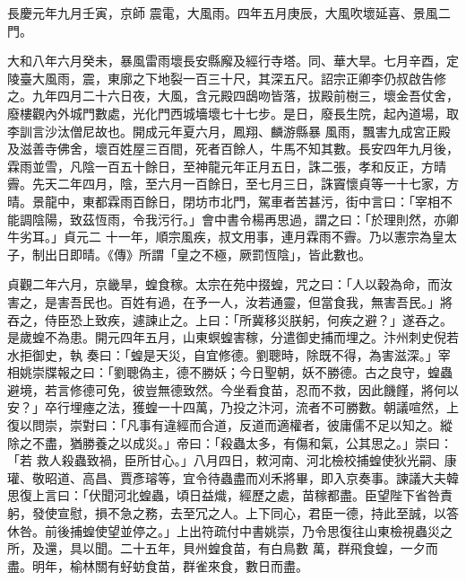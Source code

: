 \begin{pinyinscope}
 長慶元年九月壬寅，京師
 震電，大風雨。四年五月庚辰，大風吹壞延喜、景風二門。



 大和八年六月癸未，暴風雷雨壞長安縣廨及經行寺塔。同、華大旱。七月辛酉，定陵臺大風雨，震，東廓之下地裂一百三十尺，其深五尺。詔宗正卿李仍叔啟告修之。九年四月二十六日夜，大風，含元殿四鴟吻皆落，拔殿前樹三，壞金吾仗舍，廢樓觀內外城門數處，光化門西城墻壞七十七步。是日，廢長生院，起內道場，取李訓言沙汰僧尼故也。開成元年夏六月，鳳翔、麟游縣暴
 風雨，飄害九成宮正殿及滋善寺佛舍，壞百姓屋三百間，死者百餘人，牛馬不知其數。長安四年九月後，霖雨並雪，凡陰一百五十餘日，至神龍元年正月五日，誅二張，孝和反正，方晴霽。先天二年四月，陰，至六月一百餘日，至七月三日，誅竇懷貞等一十七家，方晴。景龍中，東都霖雨百餘日，閉坊市北門，駕車者苦甚污，街中言曰：「宰相不能調陰陽，致茲恆雨，令我污行。」會中書令楊再思過，謂之曰：「於理則然，亦卿牛劣耳。」貞元二
 十一年，順宗風疾，叔文用事，連月霖雨不霽。乃以憲宗為皇太子，制出日即晴。《傳》所謂「皇之不極，厥罰恆陰」，皆此數也。



 貞觀二年六月，京畿旱，蝗食稼。太宗在苑中掇蝗，咒之曰：「人以穀為命，而汝害之，是害吾民也。百姓有過，在予一人，汝若通靈，但當食我，無害吾民。」將吞之，侍臣恐上致疾，遽諫止之。上曰：「所冀移災朕躬，何疾之避？」遂吞之。是歲蝗不為患。開元四年五月，山東螟蝗害稼，分遣御史捕而埋之。汴州刺史倪若水拒御史，執
 奏曰：「蝗是天災，自宜修德。劉聰時，除既不得，為害滋深。」宰相姚崇牒報之曰：「劉聰偽主，德不勝妖；今日聖朝，妖不勝德。古之良守，蝗蟲避境，若言修德可免，彼豈無德致然。今坐看食苗，忍而不救，因此饑饉，將何以安？」卒行埋瘞之法，獲蝗一十四萬，乃投之汴河，流者不可勝數。朝議喧然，上復以問崇，崇對曰：「凡事有違經而合道，反道而適權者，彼庸儒不足以知之。縱除之不盡，猶勝養之以成災。」帝曰：「殺蟲太多，有傷和氣，公其思之。」崇曰：「若
 救人殺蟲致禍，臣所甘心。」八月四日，敕河南、河北檢校捕蝗使狄光嗣、康瓘、敬昭道、高昌、賈彥璿等，宜令待蟲盡而刈禾將畢，即入京奏事。諫議大夫韓思復上言曰：「伏聞河北蝗蟲，頃日益熾，經歷之處，苗稼都盡。臣望陛下省咎責躬，發使宣慰，損不急之務，去至冗之人。上下同心，君臣一德，持此至誠，以答休咎。前後捕蝗使望並停之。」上出符疏付中書姚崇，乃令思復往山東檢視蟲災之所，及還，具以聞。二十五年，貝州蝗食苗，有白鳥數
 萬，群飛食蝗，一夕而盡。明年，榆林關有虸蚄食苗，群雀來食，數日而盡。




\end{pinyinscope}
